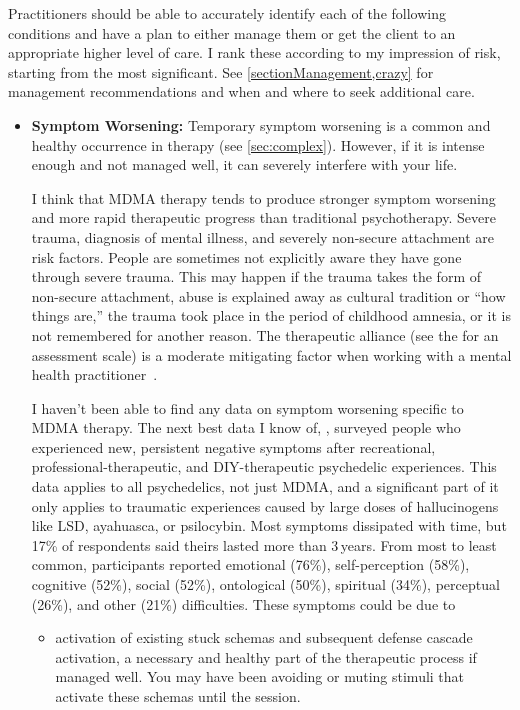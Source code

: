 \documentclass[11pt,oneside]{book}
\let\cite\parencite
\begin{document}
Practitioners should be able to accurately identify each of the following conditions and have a plan to either manage them or get the client to an appropriate higher level of care. I rank these according to my impression of risk, starting from the most significant. See \cref{sectionManagement,crazy} for management recommendations and when and where to seek additional care.
\begin{itemize}
    \item \textbf{Symptom Worsening:} Temporary symptom worsening is a common and healthy occurrence in therapy (see \cref{sec:complex}). However, if it is intense enough and not managed well, it can severely interfere with your life.

    I think that MDMA therapy tends to produce stronger symptom worsening and more rapid therapeutic progress than traditional psychotherapy. Severe trauma, diagnosis of mental illness, and severely non-secure attachment are risk factors. People are sometimes not explicitly aware they have gone through severe trauma. This may happen if the trauma takes the form of non-secure attachment, abuse is explained away as cultural tradition or \enquote{how things are,} the trauma took place in the period of childhood amnesia, or it is not remembered for another reason. The therapeutic alliance (see the \cite{BRWAIdownload} for an assessment scale) is a moderate mitigating factor when working with a mental health practitioner~\cite{fluckiger2018alliance}.

    I haven't been able to find any data on symptom worsening specific to MDMA therapy. The next best data I know of, \textcite{evans2023extended}, surveyed people who experienced new, persistent negative symptoms after recreational, professional-therapeutic, and DIY-therapeutic psychedelic experiences. This data applies to all psychedelics, not just MDMA, and a significant part of it only applies to traumatic experiences caused by large doses of hallucinogens like LSD, ayahuasca, or psilocybin. Most symptoms dissipated with time, but 17\% of respondents said theirs lasted more than 3\,years. From most to least common, participants reported emotional (76\%), self-perception (58\%), cognitive (52\%), social (52\%), ontological (50\%), spiritual (34\%), perceptual (26\%), and other (21\%) difficulties. These symptoms could be due to~\cite{calder2025traumatic}
    \begin{itemize}
        \item activation of existing stuck schemas and subsequent defense cascade activation, a necessary and healthy part of the therapeutic process if managed well. You may have been avoiding or muting stimuli that activate these schemas until the session.
        

\end{itemize}
\end{itemize}
\end{document}
